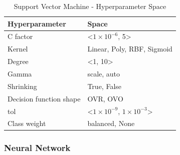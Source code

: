         
        \begin{table}[H]
            \small
            \setlength{\tabcolsep}{8pt}
            \renewcommand{\arraystretch}{1.3}
            \centering
                \caption[Support Vector Machine - Hyperparameter Space]{Support Vector Machine - Hyperparameter Space}\label{tab:svmspace}
                \begin{tabular}{ll}
            \toprule
            \textbf{Hyperparameter} & \textbf{Space}\\
            \midrule
            \hline
            C factor & <$1\times 10^{-6}$, 5> \\
            Kernel & Linear, Poly, RBF, Sigmoid \\
            Degree & <1, 10> \\
            Gamma & scale, auto \\
            Shrinking & True, False \\
            Decision function shape & OVR, OVO \\
            tol & <$1\times 10^{-9}$, $1\times 10^{-3}$> \\
            Class weight & balanced, None \\
            \hline
            \bottomrule
            \end{tabular}
            \vspace{0.7em}
        
            \vspace{-1em}
        \end{table}
        
        
        \subsubsection{Neural Network}
        
